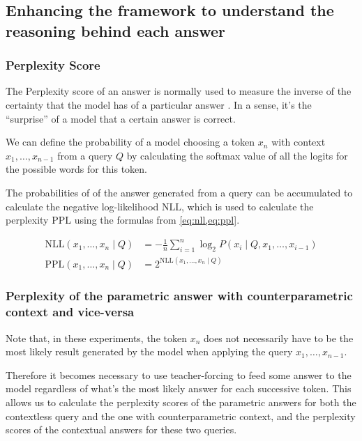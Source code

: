 \newpage{}

\subsection{Enhancing the framework to understand the reasoning behind each answer}
\label{method_perplexity}

\subsubsection{Perplexity Score}
\newcommand{\NLL}{\text{NLL}}
\newcommand{\PPL}{\text{PPL}}

The Perplexity score of an answer is normally used to measure the inverse of the certainty that the model has of a particular answer \citep{gpt3,retro}.
In a sense, it's the ``surprise'' of a model that a certain answer is correct.

We can define the probability of a model choosing a token $x_n$ with context $x_1, \dots, x_{n - 1}$ from a query $Q$ by calculating the softmax value of all the logits for the possible words for this token.

The probabilities of of the answer generated from a query can be accumulated to calculate the negative log-likelihood $\NLL$, which is used to calculate the perplexity $\PPL$ using the formulas from \cref{eq:nll,eq:ppl}.

\begin{align}
	\NLL \left( x_1, \dots, x_n \mid Q \right) &= - \frac{1}{n} \sum^n_{i = 1} \log_2 P \left( x_i \mid Q, x_1, \dots, x_{i - 1} \right) \label{eq:nll} \\[1ex]
	\PPL \left( x_1, \dots, x_n \mid Q \right) &= {2 ^ {\text{NLL} \left( x_1, \dots, x_n \mid Q \right)}} \label{eq:ppl}
\end{align}

\subsubsection{Perplexity of the parametric answer with counterparametric context and vice-versa}

Note that, in these experiments, the token $x_n$ does not necessarily have to be the most likely result generated by the model when applying the query $x_1, \dots, x_{n - 1}$.

Therefore it becomes necessary to use teacher-forcing \citep{teacher_forcing} to feed some answer to the model regardless of what's the most likely answer for each successive token. This allows us to calculate the perplexity scores of the parametric answers for both the contextless query and the one with counterparametric context, and the perplexity scores of the contextual answers for these two queries.

